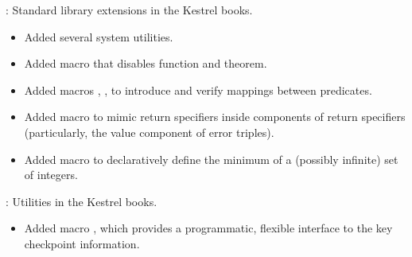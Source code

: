 
\begin{frame}

\implibtitle

:
Standard library extensions in the Kestrel books.
\begin{itemize}
\item Added several system utilities.
\item Added macro  that disables function and theorem.
\item Added macros , , 
      to introduce and verify mappings between predicates.
\item Added macro  to mimic  return specifiers
      inside components of  return specifiers
      (particularly, the value component of error triples).
\item Added macro  to declaratively define
      the minimum of a (possibly infinite) set of integers.
\end{itemize}

\end{frame}


\begin{frame}

\implibtitle

:
Utilities in the Kestrel books.
\begin{itemize}
\item Added macro ,
      which provides a programmatic, flexible interface
      to the key checkpoint information.
\end{itemize}

\end{frame}


